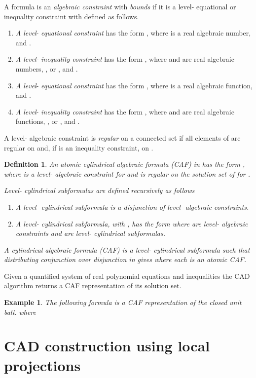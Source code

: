 \documentclass[english]{amsart}
\numberwithin{equation}{section}
\numberwithin{figure}{section}
\newtheorem{example}[thm]{Example}
\newtheorem{defn}[thm]{Definition}
\begin{document}
A formula  is an \emph{algebraic constraint} with \emph{bounds}
 if it is a level- equational or inequality constraint
with  defined as follows.\emph{ }
\begin{enumerate}
\item \emph{A level}- \emph{equational constraint} has the form ,
where  is a real algebraic number, and .
\item \emph{A level}- \emph{inequality constraint} has the form ,
where  and  are real algebraic numbers, ,
or , and . 
\item \emph{A level}- \emph{equational constraint} has the form ,
where  is a real algebraic function, and .
\item \emph{A level}- \emph{inequality constraint} has the form ,
where  and  are real algebraic functions, ,
or , and . 
\end{enumerate}
A level- algebraic constraint  is \emph{regular} on a connected
set  if all elements of  are regular
on  and, if  is an inequality constraint,  on
.
\begin{defn}
An \emph{atomic cylindrical algebraic formula (CAF)}  in 
has the form , where  is a
level- algebraic constraint for  and 
is regular on the solution set of 
for . 

\emph{Level- cylindrical subformulas} are defined recursively
as follows
\begin{enumerate}
\item A level- cylindrical subformula is a disjunction of level-
algebraic constraints.
\item A level- cylindrical subformula, with , has the form
where  are level- algebraic constraints and  are
level- cylindrical subformulas.
\end{enumerate}
A \emph{cylindrical algebraic formula (CAF)} is a level- cylindrical
subformula  such that distributing conjunction over disjunction
in  gives 
where each  is an atomic CAF. 
\end{defn}
Given a quantified system of real polynomial equations and inequalities
the CAD algorithm \cite{S7} returns a CAF representation of its solution
set. 
\begin{example}
The following formula  is a CAF representation of the closed
unit ball.
where 

\end{example}

\section{CAD construction using local projections}
\end{document}
